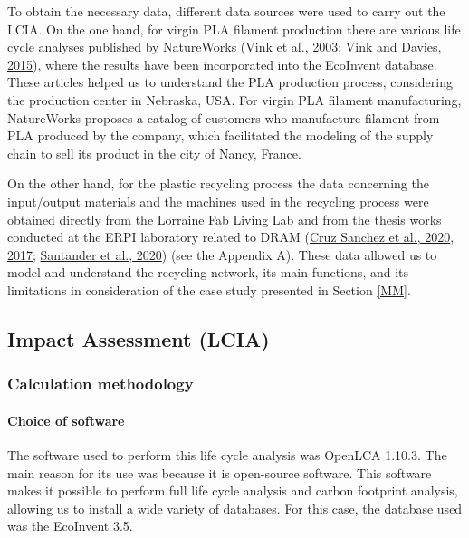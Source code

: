 \documentclass[12pt]{elsarticle} %
\begin{document}
To obtain the necessary data, different data sources were used to carry out the LCIA.
On the one hand, for virgin PLA filament production there are various life cycle analyses published by NatureWorks (\protect\hyperlink{ref-vink2003}{Vink et al., 2003}; \protect\hyperlink{ref-vink2015}{Vink and Davies, 2015}), where the results have been incorporated into the EcoInvent database.
These articles helped us to understand the PLA production process, considering the production center in Nebraska, USA.
For virgin PLA filament manufacturing, NatureWorks proposes a catalog of customers who manufacture filament from PLA produced by the company, which facilitated the modeling of the supply chain to sell its product in the city of Nancy, France.

On the other hand, for the plastic recycling process the data concerning the input/output materials and the machines used in the recycling process were obtained directly from the Lorraine Fab Living Lab and from the thesis works conducted at the ERPI laboratory related to DRAM (\protect\hyperlink{ref-CruzSanchez2020}{Cruz Sanchez et al., 2020}, \protect\hyperlink{ref-CruzSanchez2017}{2017}; \protect\hyperlink{ref-Santander2020}{Santander et al., 2020}) (see the Appendix A).
These data allowed us to model and understand the recycling network, its main functions, and its limitations in consideration of the case study presented in Section \ref{MM}.

\hypertarget{impact-assessment-lcia}{%
\subsection{Impact Assessment (LCIA)}\label{impact-assessment-lcia}}

\hypertarget{calculation-methodology}{%
\subsubsection{Calculation methodology}\label{calculation-methodology}}

\hypertarget{choice-of-software}{%
\paragraph{Choice of software}\label{choice-of-software}}

The software used to perform this life cycle analysis was OpenLCA 1.10.3.
The main reason for its use was because it is open-source software.
This software makes it possible to perform full life cycle analysis and carbon footprint analysis, allowing us to install a wide variety of databases. For this case, the database used was the EcoInvent 3.5.
\end{document}
